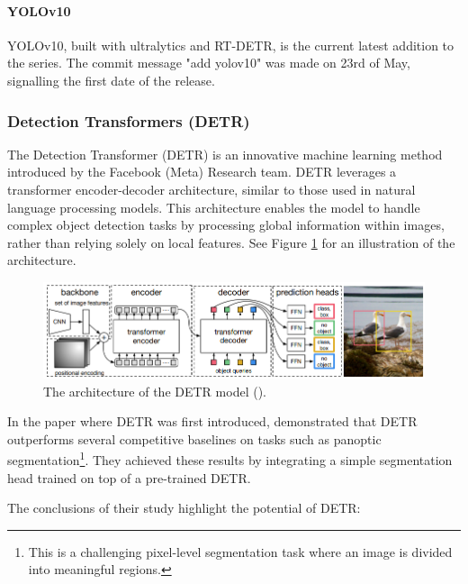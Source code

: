 \paragraph{YOLOv10}
YOLOv10, built with ultralytics and RT-DETR, is the current latest addition to the series. The commit message "add yolov10" was made on 23rd of May, signalling the first date of the release.

\subsubsection{Detection Transformers (DETR)}
\label{sec:detr}
The Detection Transformer (DETR) is an innovative machine learning method introduced by the Facebook (Meta) Research team. DETR leverages a transformer encoder-decoder architecture, similar to those used in natural language processing models. This architecture enables the model to handle complex object detection tasks by processing global information within images, rather than relying solely on local features. See Figure \ref{fig:detrarchitecture} for an illustration of the architecture.

\begin{figure}[H]
\centering
\includegraphics[width=1\linewidth]{Images/Diagrams/DETR2.png}
\caption{\centering The architecture of the DETR model (\cite{carion2020endtoend}).}
\label{fig:detrarchitecture}
\end{figure}

In the paper where DETR was first introduced, \citeauthor{carion2020endtoend} demonstrated that DETR outperforms several competitive baselines on tasks such as panoptic segmentation\footnote{This is a challenging pixel-level segmentation task where an image is divided into meaningful regions.}. They achieved these results by integrating a simple segmentation head trained on top of a pre-trained DETR.

The conclusions of their study highlight the potential of DETR:

